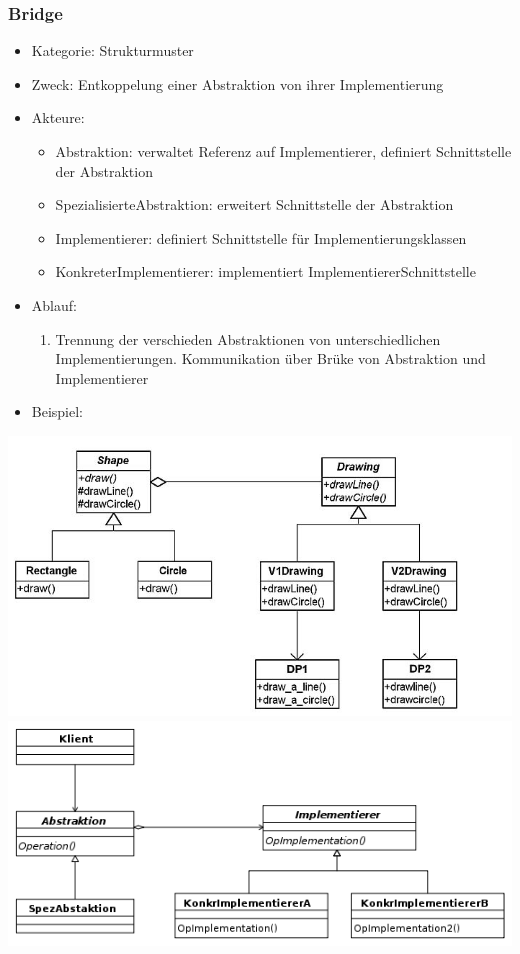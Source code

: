 \documentclass[11pt, fleqn, a4paper, leqno]{scrartcl} %
\begin{document}
		\subsubsection{Bridge}
			\begin{itemize}
				\item Kategorie: Strukturmuster
				\item Zweck: Entkoppelung einer Abstraktion von ihrer Implementierung
				\item Akteure: 
				\begin{itemize}
					\item Abstraktion: verwaltet Referenz auf Implementierer, definiert Schnittstelle der Abstraktion
					\item SpezialisierteAbstraktion: erweitert Schnittstelle der Abstraktion
					\item Implementierer: definiert Schnittstelle für Implementierungsklassen
					\item KonkreterImplementierer: implementiert ImplementiererSchnittstelle
				\end{itemize}
				\item Ablauf:
				\begin{enumerate}
					\item Trennung der verschieden Abstraktionen von unterschiedlichen Implementierungen. Kommunikation über Brüke von Abstraktion und Implementierer
				\end{enumerate}
				\item Beispiel:			
			\end{itemize}
			\includegraphics[scale=0.4]{images/bridge-example.jpg}\\
			\includegraphics[scale=0.4]{images/bridge.png}
			\newpage
\end{document}
